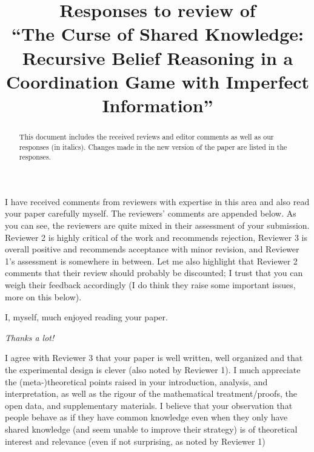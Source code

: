 \documentclass[a4paper]{article}
\title{Responses to review of \\ ``The Curse of Shared Knowledge: Recursive Belief Reasoning in a Coordination Game with Imperfect Information''}
\newtheorem{response}{Response}
\begin{document}
\maketitle
\begin{abstract}
This document includes the received reviews and editor comments as well as our responses (in italics). Changes made in the new version of the paper are listed in the responses.
\end{abstract}


I have received comments from reviewers with expertise in this area and also read your paper carefully myself. The reviewers’ comments are appended below. As you can see, the reviewers are quite mixed in their assessment of your submission. Reviewer 2 is highly critical of the work and recommends rejection, Reviewer 3 is overall positive and recommends acceptance with minor revision, and Reviewer 1’s assessment is somewhere in between. Let me also highlight that Reviewer 2 comments that their review should probably be discounted; I trust that you can weigh their feedback accordingly (I do think they raise some important issues, more on this below).


I, myself, much enjoyed reading your paper.


\medskip
{\noindent \itshape
Thanks a lot!
}

\medskip
I agree with Reviewer 3 that your paper is well written, well organized and that the experimental design is clever (also noted by Reviewer 1). I much appreciate the (meta-)theoretical points raised in your introduction, analysis, and interpretation, as well as the rigour of the mathematical treatment/proofs, the open data, and supplementary materials. I believe that your observation that people behave as if they have common knowledge even when they only have shared knowledge (and seem unable to improve their strategy) is of theoretical interest and relevance (even if not surprising, as noted by Reviewer 1)
\end{document}
